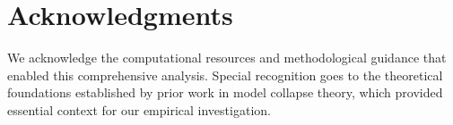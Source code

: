 \documentclass{article}
\begin{document}
\section{Acknowledgments}

We acknowledge the computational resources and methodological guidance that enabled this comprehensive analysis. Special recognition goes to the theoretical foundations established by prior work in model collapse theory, which provided essential context for our empirical investigation.



\end{document}
